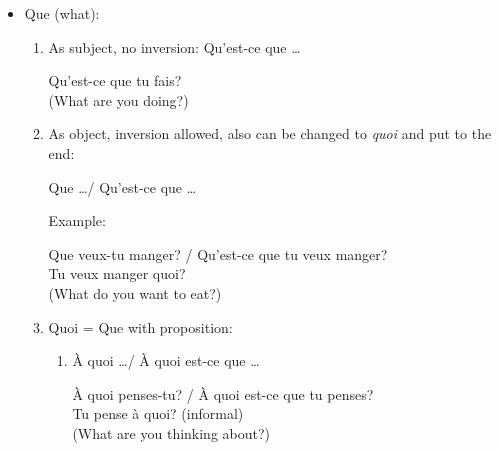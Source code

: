 \documentclass{book}
\begin{document}
\begin{itemize}
\begin{enumerate}
                    \item Avec qui \dots / Avec qui est-ce que \dots
                        \begin{center}
                            Avec qui est-ce que tu vas? \\
                            (Who are you going with?)
                        \end{center}
                \end{enumerate}

            \item Que (what):
                \begin{enumerate}
                    \item As subject, no inversion: Qu'est-ce que \dots
                        \begin{center}
                            Qu'est-ce que tu fais? \\
                            (What are you doing?)
                        \end{center}

                    \item As object, inversion allowed, also can be changed to \textit{quoi} and put to the end:
                        \begin{center}
                            Que \dots / Qu'est-ce que \dots
                        \end{center}
                        Example:
                        \begin{center}
                            Que veux-tu manger? / Qu'est-ce que tu veux manger? \\
                            Tu veux manger quoi? \\
                            (What do you want to eat?)
                        \end{center}

                    \item Quoi = Que with proposition:
                        \begin{enumerate}
                            \item À quoi \dots / À quoi est-ce que \dots
                                \begin{center}
                                    À quoi penses-tu? / À quoi est-ce que tu penses? \\
                                    Tu pense à quoi? (informal) \\
                                    (What are you thinking about?)
                                \end{center}


\end{enumerate}
\end{enumerate}
\end{itemize}
\end{document}
